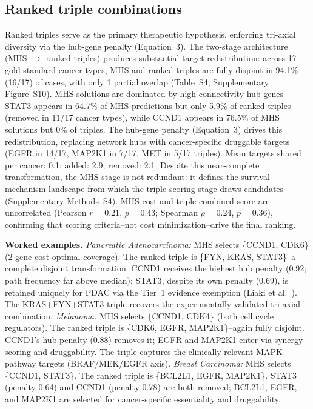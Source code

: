 \documentclass[times, twoside, watermark]{zHenriquesLab-StyleBioRxiv}
\begin{document}
\subsection*{Ranked triple combinations}
Ranked triples serve as the primary therapeutic hypothesis, enforcing tri-axial diversity via the hub-gene penalty (Equation~3). The two-stage architecture (MHS $\to$ ranked triples) produces substantial target redistribution: across 17 gold-standard cancer types, MHS and ranked triples are fully disjoint in 94.1\% (16/17) of cases, with only 1 partial overlap (Table~S4; Supplementary Figure~S10). MHS solutions are dominated by high-connectivity hub genes--STAT3 appears in 64.7\% of MHS predictions but only 5.9\% of ranked triples (removed in 11/17 cancer types), while CCND1 appears in 76.5\% of MHS solutions but 0\% of triples. The hub-gene penalty (Equation~3) drives this redistribution, replacing network hubs with cancer-specific druggable targets (EGFR in 14/17, MAP2K1 in 7/17, MET in 5/17 triples). Mean targets shared per cancer: 0.1; added: 2.9; removed: 2.1. Despite this near-complete transformation, the MHS stage is not redundant: it defines the survival mechanism landscape from which the triple scoring stage draws candidates (Supplementary Methods~S4). MHS cost and triple combined score are uncorrelated (Pearson $r = 0.21$, $p = 0.43$; Spearman $\rho = 0.24$, $p = 0.36$), confirming that scoring criteria--not cost minimization--drive the final ranking.

\textbf{Worked examples.}
\emph{Pancreatic Adenocarcinoma:} MHS selects \{CCND1, CDK6\} (2-gene cost-optimal coverage). The ranked triple is \{FYN, KRAS, STAT3\}--a complete disjoint transformation. CCND1 receives the highest hub penalty (0.92; path frequency far above median); STAT3, despite its own penalty (0.69), is retained uniquely for PDAC via the Tier~1 evidence exemption (Liaki et al.~\cite{Liaki2025}). The KRAS+FYN+STAT3 triple recovers the experimentally validated tri-axial combination.
\emph{Melanoma:} MHS selects \{CCND1, CDK4\} (both cell cycle regulators). The ranked triple is \{CDK6, EGFR, MAP2K1\}--again fully disjoint. CCND1's hub penalty (0.88) removes it; EGFR and MAP2K1 enter via synergy scoring and druggability. The triple captures the clinically relevant MAPK pathway targets (BRAF/MEK/EGFR axis).
\emph{Breast Carcinoma:} MHS selects \{CCND1, STAT3\}. The ranked triple is \{BCL2L1, EGFR, MAP2K1\}. STAT3 (penalty 0.64) and CCND1 (penalty 0.78) are both removed; BCL2L1, EGFR, and MAP2K1 are selected for cancer-specific essentiality and druggability.
\end{document}

